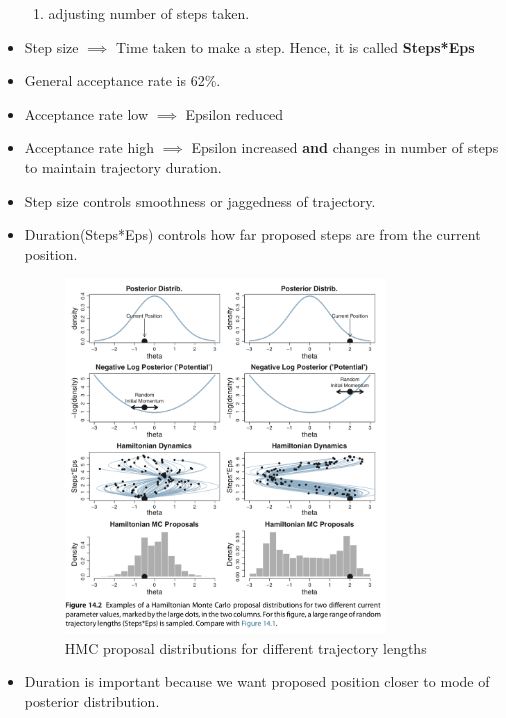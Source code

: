 \documentclass[a4paper]{article}
\begin{document}
\begin{itemize}
\begin{enumerate}
        \item adjusting number of steps taken.
    \end{enumerate}
    \item Step size $\implies$ Time taken to make a step. Hence, it is called \textbf{Steps*Eps}  
    \item General acceptance rate is 62\%.
    \item Acceptance rate low $\implies$ Epsilon reduced
    \item Acceptance rate high $\implies$ Epsilon increased \textbf{and} changes in number of steps to maintain trajectory duration. 
    \item Step size controls smoothness or jaggedness of trajectory.
    \item Duration(Steps*Eps) controls how far proposed steps are from the current position.
    \begin{figure}[H]
        \centering
        \includegraphics[width=0.8\textwidth]{trajectory_lengths}
        \caption{HMC proposal distributions for different trajectory lengths}
        \label{fig:trajectory_lengths}
    \end{figure}
    \item Duration is important because we want proposed position closer to mode of posterior distribution.
\end{itemize}
\end{document}
